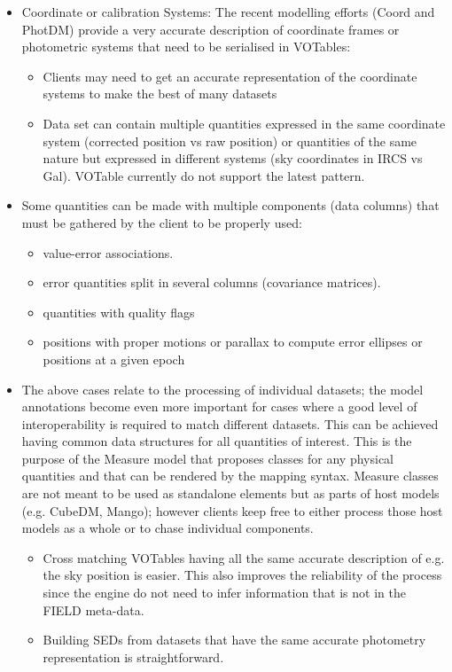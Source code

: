 \begin{itemize}
  \item Coordinate or calibration Systems: The recent modelling efforts (Coord and PhotDM) provide a very accurate description of coordinate frames or photometric systems that need to be serialised in VOTables:
  \begin{itemize}
    \item Clients may need to get an accurate representation of the coordinate systems to make the best of many datasets  
    \item Data set can contain multiple quantities expressed in the same coordinate system (corrected position vs raw position) or 
             quantities of the same nature but expressed in different systems (sky coordinates in IRCS vs Gal). VOTable currently do not support the latest pattern.
  \end{itemize} 
  
  \item Some quantities can be made with multiple components (data columns) that must be gathered by the client to be properly used:
  \begin{itemize}
    \item value-error associations. 
    \item error quantities split in several columns (covariance matrices). 
    \item quantities with quality flags
    \item positions with proper motions or parallax to compute error ellipses or positions at a given epoch
  \end{itemize} 

  \item The above cases relate to the processing of individual datasets; the model annotations become even more important for cases where a good level of interoperability is required to match different datasets. 
           This can be achieved having common data structures for all quantities of interest. This is the purpose of the Measure model that proposes classes for 
           any physical quantities and that can be rendered by the mapping syntax. Measure classes are not meant to be used as standalone elements but as parts of host models (e.g. CubeDM, Mango);
           however clients keep free to either process those host models as a whole or to chase individual components.
    \begin{itemize}
      \item Cross matching VOTables having all the same accurate description of e.g. the sky position is easier. 
               This also improves the reliability of the process since the engine do not need to infer information that is not in the FIELD meta-data.
      \item Building SEDs from datasets that have the same accurate photometry representation is straightforward.
   \end{itemize}          


\end{itemize}
